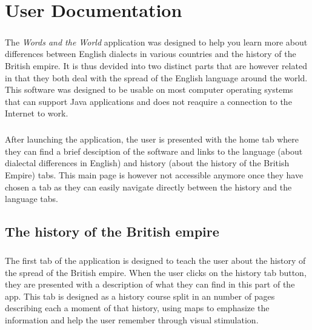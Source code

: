 \documentclass[11pt, a4paper]{report}
\begin{document}
\newpage
\tableofcontents
\newpage


\chapter*{User Documentation}
\paragraph{}The \textit{Words and the World} application was designed to help you learn more about differences between English dialects in various countries and the history of the British empire. It is thus devided into two distinct parts that are however related in that they both deal with the spread of the English language around the world. This software was designed to be usable on most computer operating systems that can support Java applications and does not reaquire a connection to the Internet to work.

\paragraph{}After launching the application, the user is presented with the home tab where they can find a brief desciption of the software and links to the language (about dialectal differences in English) and history (about the history of the British Empire) tabs. This main page is however not accessible anymore once they have chosen a tab as they can easily navigate directly between the history and the language tabs.

\section*{The history of the British empire}
\paragraph{}The first tab of the application is designed to teach the user about the history of the spread of the British empire. When the user clicks on the history tab button, they are presented with a description of what they can find in this part of the app. This tab is designed as a history course split in an number of pages describing each a moment of that history, using maps to emphasize the information and help the user remember through visual stimulation.
\end{document}

